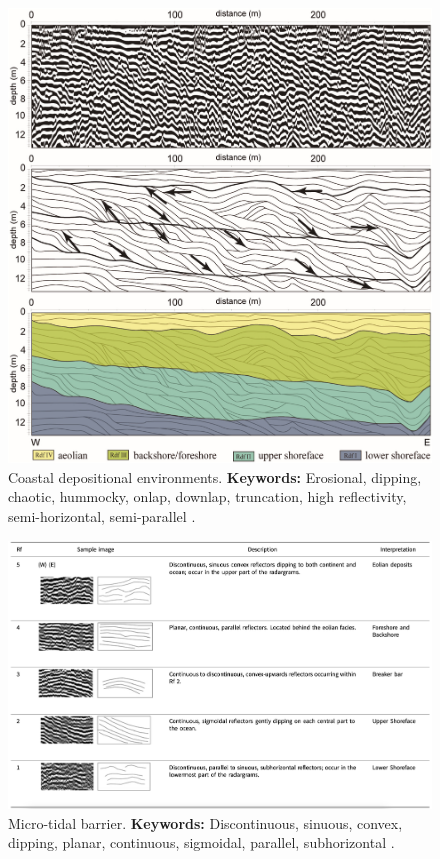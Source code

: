 \begin{figure}[h!]
    \centering
    \includegraphics[width=0.9\linewidth]{Figures/0.2GPR/Leandro2018_coastal_2.png}
    \caption[Coastal depositional environments.]{Coastal depositional environments. \textbf{Keywords: } Erosional, dipping, chaotic, hummocky, onlap, downlap, truncation, high reflectivity, semi-horizontal, semi-parallel \citep{Leandro2019}.}
    \label{fig:Leandro2019-2}
\end{figure}

\begin{landscape}
    \begin{figure}[h!]
    \centering
    \includegraphics[width=0.9\linewidth]{Figures/0.2GPR/Santos2022_2.png}
    \caption[Micro-tidal barrier.]{Micro-tidal barrier. \textbf{Keywords: } Discontinuous, sinuous, convex, dipping, planar, continuous, sigmoidal, parallel, subhorizontal \citep{Santos2022}.}
    \label{fig:Santos2022-2}
\end{figure}
\end{landscape}

